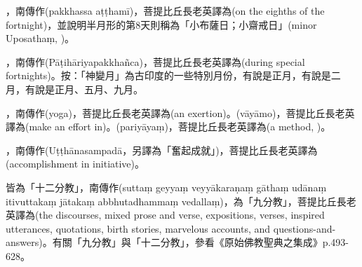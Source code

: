 \startitemgroup[noteitems]
\item{}，南傳作(pakkhassa aṭṭhamī)，菩提比丘長老英譯為(on the eighths of the fortnight)，並說明半月形的第8天則稱為「小布薩日；小齋戒日」(minor Uposathaṃ, )。
\stopitemgroup

\startitemgroup[noteitems]
\item{}，南傳作(Pāṭihāriyapakkhañca)，菩提比丘長老英譯為(during special fortnights)。按：「神變月」為古印度的一些特別月份，有說是正月，有說是二月，有說是正月、五月、九月。
\stopitemgroup

\startitemgroup[noteitems]
\item{}，南傳作(yoga)，菩提比丘長老英譯為(an exertion)。(vāyāmo)，菩提比丘長老英譯為(make an effort in)。(pariyāyaṃ)，菩提比丘長老英譯為(a method, )。
\item{}，南傳作(Uṭṭhānasampadā，另譯為「奮起成就」)，菩提比丘長老英譯為(accomplishment in initiative)。
\stopitemgroup

\startitemgroup[noteitems]
\item{}皆為「十二分教」，南傳作(suttaṃ geyyaṃ veyyākaraṇaṃ gāthaṃ udānaṃ itivuttakaṃ jātakaṃ abbhutadhammaṃ vedallaṃ)，為「九分教」，菩提比丘長老英譯為(the discourses, mixed prose and verse, expositions, verses, inspired utterances, quotations, birth stories, marvelous accounts, and questions-and-answers)。有關「九分教」與「十二分教」，參看《原始佛教聖典之集成》p.493-628。
\stopitemgroup

